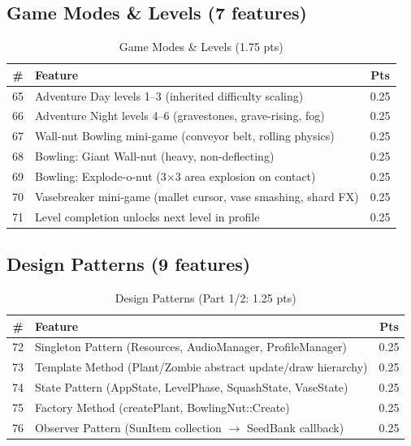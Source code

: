 \documentclass[12pt,a4paper]{article}
\begin{document}
\subsection{Game Modes \& Levels (7 features)}
\begin{table}[htbp]
\centering
\footnotesize
\begin{tabular}{clc}
\toprule
\textbf{\#} & \textbf{Feature} & \textbf{Pts} \\
\midrule
65 & Adventure Day levels 1--3 (inherited difficulty scaling) & 0.25 \\
66 & Adventure Night levels 4--6 (gravestones, grave-rising, fog) & 0.25 \\
67 & Wall-nut Bowling mini-game (conveyor belt, rolling physics) & 0.25 \\
68 & Bowling: Giant Wall-nut (heavy, non-deflecting) & 0.25 \\
69 & Bowling: Explode-o-nut (3$\times$3 area explosion on contact) & 0.25 \\
70 & Vasebreaker mini-game (mallet cursor, vase smashing, shard FX) & 0.25 \\
71 & Level completion unlocks next level in profile & 0.25 \\
\bottomrule
\end{tabular}
\caption{Game Modes \& Levels (1.75 pts)}
\end{table}

\subsection{Design Patterns (9 features)}
\begin{table}[htbp]
\centering
\footnotesize
\begin{tabular}{clc}
\toprule
\textbf{\#} & \textbf{Feature} & \textbf{Pts} \\
\midrule
72 & Singleton Pattern (Resources, AudioManager, ProfileManager) & 0.25 \\
73 & Template Method (Plant/Zombie abstract update/draw hierarchy) & 0.25 \\
74 & State Pattern (AppState, LevelPhase, SquashState, VaseState) & 0.25 \\
75 & Factory Method (createPlant, BowlingNut::Create) & 0.25 \\
76 & Observer Pattern (SunItem collection $\to$ SeedBank callback) & 0.25 \\
\bottomrule
\end{tabular}
\caption{Design Patterns (Part 1/2: 1.25 pts)}
\end{table}
\end{document}
